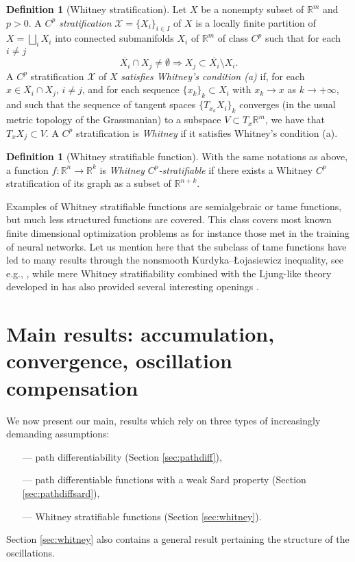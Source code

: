 \documentclass[11pt]{article}
\theoremstyle{definition}
\newtheorem{defn}[thm]{Definition}
\theoremstyle{remark}
\newcommand{\R}{\mathbb{R}}
\begin{document}
\begin{defn}[Whitney stratification]\label{def:stratification}
 Let $X$ be a nonempty subset of $\R^m$ and $p>0$. A \emph{$C^p$ stratification} $\mathcal X=\{X_i\}_{i\in I}$ of $X$ is a locally finite partition of $X=\bigsqcup_iX_i$ into connected submanifolds $X_i$ of $\R^m$ of class $C^p$ such that for each $i\neq j$
 \[\overline{X_i}\cap X_j\neq \emptyset \Longrightarrow X_j\subset \overline{X_i}\setminus X_i.\]
 A $C^p$ stratification $\mathcal X$ of $X$ \emph{satisfies Whitney's condition (a)} if, for each $x\in \overline{X_i}\cap X_j$, $i\neq j$, and for each sequence $\{x_k\}_k\subset X_i$ with $x_k\to x$ as $k\to+\infty$, and such that the sequence of tangent spaces $\{T_{x_k}X_i\}_k$ converges (in the usual metric topology of the Grassmanian) to a subspace $V\subset T_x\R^m$, we have that $T_xX_j\subset V$. A $C^p$ stratification is \emph{Whitney} if it satisfies Whitney's condition (a).
\end{defn}

\begin{defn}[Whitney stratifiable function]\label{def:stratifiablefunc}
 With the same notations as above,
 a function $f\colon \R^n\to\R^k$ is \emph{Whitney $C^p$-stratifiable} if there exists a Whitney $C^p$ stratification of its graph as a subset of $\R^{n+k}$. 
\end{defn}

Examples of Whitney stratifiable functions  are semialgebraic or tame functions, but much less structured functions are covered. This class covers most known finite dimensional optimization problems as for instance those met in the training of neural networks. Let us mention here that the subclass of tame functions have led to many results through the nonsmooth Kurdyka--{\L}ojasiewicz inequality, see e.g.,  \cite{attouchboltesvaiter}, while mere Whitney stratifiability combined with the Ljung-like theory developed in \cite{BHS} has also provided several interesting openings \cite{Davis2019,boltepauwels,bianchi2020convergence}. 





\section{Main results: accumulation, convergence, oscillation compensation}
\label{sec:results}
We now present our main, results which rely on three types of increasingly demanding assumptions:
\begin{itemize}
\item[---] path differentiability (Section \ref{sec:pathdiff}),
\item[---] path differentiable functions with a weak Sard property (Section \ref{sec:pathdiffsard}),
\item[---] Whitney stratifiable functions (Section \ref{sec:whitney}).
\end{itemize}
Section \ref{sec:whitney} also contains a general result pertaining the structure of the oscillations.
\end{document}
